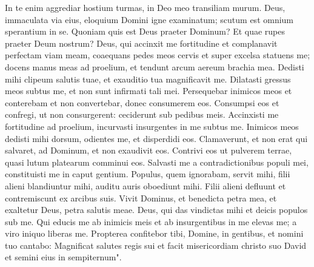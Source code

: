 \begin{biblechapter}
\verse In te enim aggrediar hostium turmas, in Deo meo transiliam murum. 
\verse Deus, immaculata via eius, eloquium Domini igne examinatum; scutum est omnium sperantium in se. 
\verse Quoniam quis est Deus praeter Dominum? Et quae rupes praeter Deum nostrum? 
\verse Deus, qui accinxit me fortitudine et complanavit perfectam viam meam, 
\verse coaequans pedes meos cervis et super excelsa statuens me; 
\verse docens manus meas ad proelium, et tendunt arcum aereum brachia mea. 
\verse Dedisti mihi clipeum salutis tuae, et exauditio tua magnificavit me. 
\verse Dilatasti gressus meos subtus me, et non sunt infirmati tali mei. 
\verse Persequebar inimicos meos et conterebam et non convertebar, donec consumerem eos. 
\verse Consumpsi eos et confregi, ut non consurgerent: ceciderunt sub pedibus meis. 
\verse Accinxisti me fortitudine ad proelium, incurvasti insurgentes in me subtus me. 
\verse Inimicos meos dedisti mihi dorsum, odientes me, et disperdidi eos. 
\verse Clamaverunt, et non erat qui salvaret, ad Dominum, et non exaudivit eos. 
\verse Contrivi eos ut pulverem terrae, quasi lutum platearum comminui eos. 
\verse Salvasti me a contradictionibus populi mei, constituisti me in caput gentium. Populus, quem ignorabam, servit mihi, 
\verse filii alieni blandiuntur mihi, auditu auris oboediunt mihi. 
\verse Filii alieni defluunt et contremiscunt ex arcibus suis. 
\verse Vivit Dominus, et benedicta petra mea, et exaltetur Deus, petra salutis meae. 
\verse Deus, qui das vindictas mihi et deicis populos sub me. 
\verse Qui educis me ab inimicis meis et ab insurgentibus in me elevas me; a viro iniquo liberas me. 
\verse Propterea confitebor tibi, Domine, in gentibus, et nomini tuo cantabo: 
\verse Magnificat salutes regis sui et facit misericordiam christo suo David et semini eius in sempiternum". 
\end{biblechapter}


